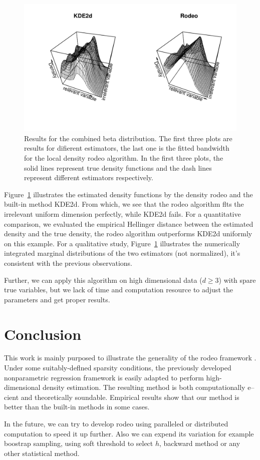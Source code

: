 \begin{figure}[ht]
    \hspace{-6em}
    \includegraphics[width=1.2\textwidth]{pic/pic5.pdf}
    \caption{Results for the combined beta distribution. The first three plots are results for difierent estimators, the last one is the fitted bandwidth for the local density rodeo algorithm. In the first three plots, the solid lines represent true density functions and the dash lines represent different estimators respectively.}
    \label{fig: 2d rodeo 2in1}
\end{figure}

Figure~\ref{fig: 2d rodeo 2in1} illustrates the estimated density functions by the density rodeo and the built-in method KDE2d. 
From which, we see that the rodeo algorithm flts the irrelevant uniform dimension perfectly, while KDE2d fails. 
For a quantitative comparison, we evaluated the empirical Hellinger distance between the estimated density and the true density, the rodeo algorithm outperforms KDE2d uniformly on this example. 
For a qualitative study, Figure~\ref{fig: 2d rodeo 2in1} illustrates the numerically integrated marginal distributions of the two estimators (not normalized), it’s consistent with the previous observations. 

Further, we can apply this algorithm on high dimensional data ($d \ge 3$) with spare true variables, but we lack of time and computation resource to adjust the parameters and get proper results. 


\section{Conclusion}
\label{sec:conclusion}
This work is mainly purposed to illustrate the generality of the rodeo framework \citep{Lafferty2005, wasserman2006rodeo, Lafferty2008}. 
Under some suitably-deflned sparsity conditions, the previously developed nonparametric regression framework is easily adapted to perform high-dimensional density estimation. The resulting method is both computationally e–cient and theoretically soundable. Empirical results show that our method is better than the built-in methods in some cases. 

In the future, we can try to develop rodeo using paralleled or distributed computation to speed it up further. Also we can expend its variation for example boostrap sampling,  using soft threshold to select $h$, backward method or any other statistical method.